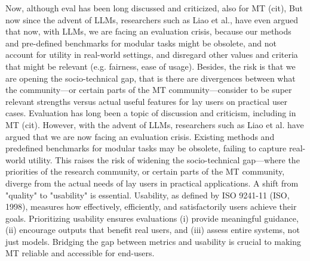 Now, although eval has been long discussed and criticized, also for MT (cit), But now since the advent of LLMs, researchers such as Liao et al.,  have even argued that now, with LLMs, we are facing an evaluation crisis, because our methods and pre-defined benchmarks for modular tasks might be obsolete, and not account for utility in real-world settings, and disregard other values and criteria that might be relevant (e.g. fairness, ease of usage). Besides, the risk is that we are opening the socio-technical gap, that is  there are divergences between what the community—or certain parts of the MT community—consider to be super relevant strengths versus actual useful features for lay users on practical user cases.
%
Evaluation has long been a topic of discussion and criticism, including in MT (cit). However, with the advent of LLMs, researchers such as Liao et al. have argued that we are now facing an evaluation crisis. Existing methods and predefined benchmarks for modular tasks may be obsolete, failing to capture real-world utility. This raises the risk of widening the socio-technical gap—where the priorities of the research community, or certain parts of the MT community, diverge from the actual needs of lay users in practical applications. 
%
A shift from "quality" to "usability" is essential. Usability, as defined by ISO 9241-11 (ISO, 1998), measures how effectively, efficiently, and satisfactorily users achieve their goals. Prioritizing usability ensures evaluations (i) provide meaningful guidance, (ii) encourage outputs that benefit real users, and (iii) assess entire systems, not just models. Bridging the gap between metrics and usability is crucial to making MT reliable and accessible for end-users.
%



